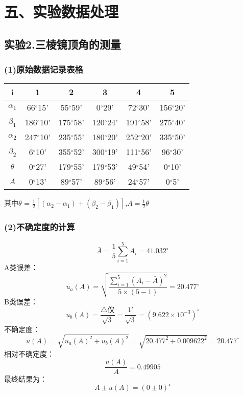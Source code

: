 \documentclass[11pt,a4paper,oneside]{article}
\begin{document}
\section*{五、实验数据处理}\subsection*{实验2.三棱镜顶角的测量}
\subsubsection*{(1)原始数据记录表格}

\begin{center}

\begin{tabular}{|c|c|c|c|c|c|}
\hline
i & 1 & 2 & 3 & 4 & 5 \\
\hline
${\alpha}_1$
&66$^{\circ}$15'&55$^{\circ}$59'&0$^{\circ}$29'&72$^{\circ}$30'&156$^{\circ}$20'
\\
\hline
${\beta}_1$
&186$^{\circ}$10'&175$^{\circ}$58'&120$^{\circ}$24'&191$^{\circ}$58'&275$^{\circ}$40'
\\
\hline
${\alpha}_2$
&247$^{\circ}$10'&235$^{\circ}$55'&180$^{\circ}$20'&252$^{\circ}$20'&335$^{\circ}$50'
\\
\hline
${\beta}_2$
&6$^{\circ}$10'&355$^{\circ}$52'&300$^{\circ}$19'&111$^{\circ}$56'&96$^{\circ}$30'
\\
\hline
${\theta}$
&0$^{\circ}$27'&179$^{\circ}$55'&179$^{\circ}$53'&49$^{\circ}$54'&0$^{\circ}$10'
\\
\hline
$A$
&0$^{\circ}$13'&89$^{\circ}$57'&89$^{\circ}$56'&24$^{\circ}$57'&0$^{\circ}$5'
\\
\hline
\end{tabular}
\vspace{10pt}

其中$\theta$ = $\displaystyle\frac{1}{2}[({\alpha}_2-{\alpha_1})+({\beta}_2-{\beta}_1)]$,$A=\displaystyle\frac{1}{2}{\theta}$

\end{center}

\subsubsection*{(2)不确定度的计算}

$$\bar{A} =\frac{1}{5}\sum\limits_{i=1}^{5}{A_i}=41.032 ^{\circ} $$
A类误差：$$u_a({A})=\sqrt{\displaystyle\frac{\sum\limits_{i=1}^{5} ({A}_i-\bar{A})^2}{5{\times}(5-1)}}=20.477 ^{\circ}$$
B类误差：$$u_b({A})=\displaystyle\frac{\bigtriangleup\text{仪}}{\sqrt{3}}
= \frac{1'}{\sqrt{3}} = (9.622 \times 10^{-3})^{\circ} $$
不确定度：$$u({A})=\sqrt{{u_a({A})}^2+{u_b({A})}^2}=\sqrt{ 20.477^2 + 0.009622^2} = 20.477 ^{\circ}$$
相对不确定度：$$\displaystyle\frac{u(A)}{A}=0.49905$$
最终结果为：$$A{\pm}u(A) = (0 {\pm} 0) ^{\circ}$$
\end{document}
